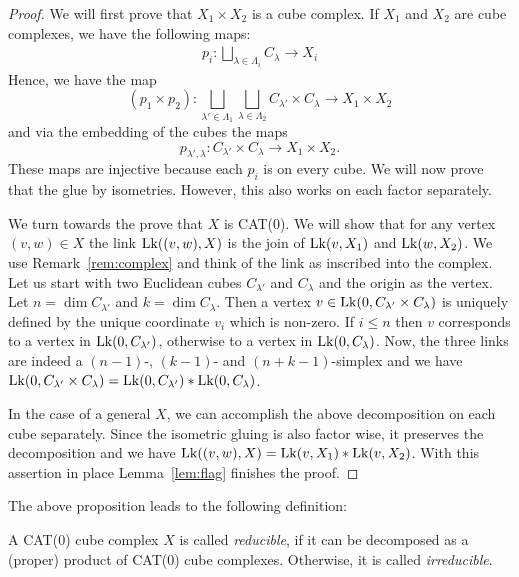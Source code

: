 \begin{proof}
  We will first prove that \(X_1 \times X_2\) is a cube complex. If \(X_1\) and \(X_2\) are cube complexes, we have the following maps:
  \begin{align*}
    p_i \colon \bigsqcup_{\lambda \in \Lambda_i} C_\lambda \to X_i
  \end{align*}
  Hence, we have the map
  \[
    (p_1 \times p_2) \colon \bigsqcup_{\lambda' \in \Lambda_1} \bigsqcup_{\lambda \in \Lambda_2} C_{\lambda'} \times C_{\lambda} \to X_1 \times X_2
  \]
  and via the embedding of the cubes the maps
  \[
    p_{\lambda', \lambda} \colon C_{\lambda'} \times C_{\lambda} \to X_1 \times X_2.
  \]
  These maps are injective because each \(p_i\) is on every cube. We will now prove that the glue by isometries. However, this also works on each factor separately.

  We turn towards the prove that \(X\) is CAT(0). We will show that for any vertex \((v,w) \in X\) the link \(\operatorname{Lk}((v,w), X)\) is the join of \(\operatorname{Lk}(v, X_1)\) and \(\operatorname{Lk}(w,X_2)\). We use Remark~\ref{rem:complex} and think of the link as inscribed into the complex. Let us start with two Euclidean cubes \(C_{\lambda'}\) and \(C_\lambda\) and the origin as the vertex. Let \(n = \dim C_{\lambda'}\) and \(k = \dim C_\lambda\). Then a vertex \(v \in \operatorname{Lk}(0, C_{\lambda'} \times C_{\lambda})\) is uniquely defined by the unique coordinate \(v_i\) which is non-zero. If \(i \leq n\) then \(v\) corresponds to a vertex in \(\operatorname{Lk}(0, C_{\lambda'})\), otherwise to a vertex in \(\operatorname{Lk}(0, C_\lambda)\). Now, the three links are indeed a \((n-1)\)-, \((k-1)\)- and \((n+k-1)\)-simplex and we have \(\operatorname{Lk}(0, C_{\lambda'} \times C_\lambda) = \operatorname{Lk}(0, C_{\lambda'}) \ast \operatorname{Lk}(0, C_{\lambda})\).

  In the case of a general \(X\), we can accomplish the above decomposition on each cube separately. Since the isometric gluing is also factor wise, it preserves the decomposition and we have \(\operatorname{Lk}((v,w), X) = \operatorname{Lk}(v, X_1) \ast \operatorname{Lk}(v, X_2)\). With this assertion in place Lemma~\ref{lem:flag} finishes the proof.
\end{proof}

The above proposition leads to the following definition:

\begin{defin}
  A CAT(0) cube complex \(X\) is called \emph{reducible}, if it can be decomposed as a (proper) product of CAT(0) cube complexes. Otherwise, it is called \emph{irreducible}.
\end{defin}

